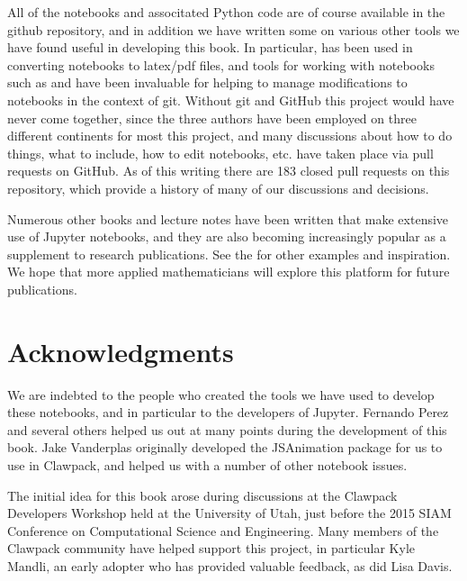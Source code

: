 \documentclass{SIAMbook2016}
\begin{document}
All of the notebooks and associtated Python code are of course available
in the github repository, and in addition we have written some
 on
various other tools we have found useful in developing this book. In
particular,  has
been used in converting notebooks to latex/pdf files, and tools for
working with notebooks such as
 and
 have been
invaluable for helping to manage modifications to notebooks in the
context of git. Without git and GitHub this
project would have never come together, since the three authors have
been employed on three different continents for most this project, and
many discussions about how to do things, what to include, how to edit
notebooks, etc. have taken place via pull requests on GitHub. As of this
writing there are 183
closed pull requests on this repository, which provide a history of many of
our discussions and decisions.

Numerous other books and lecture notes have been written that make
extensive use of Jupyter notebooks, and they are also becoming
increasingly popular as a supplement to research publications. See the
 for other examples and inspiration. We
hope that more applied mathematicians will explore this platform for
future publications.

\hypertarget{acknowledgments}{%
\section*{Acknowledgments}\label{acknowledgments}}

We are indebted to the people who created the tools we have used to
develop these notebooks, and in particular to the developers of Jupyter.
Fernando Perez and several others helped us out at many points during
the development of this book. Jake Vanderplas originally developed the
JSAnimation package for us to use in Clawpack, and helped us with a
number of other notebook issues.

The initial idea for this book arose during discussions at the Clawpack
Developers Workshop held at the University of Utah, just before the 2015
SIAM Conference on Computational Science and Engineering. Many members
of the Clawpack community have helped support this project, in
particular Kyle Mandli, an early adopter who has provided valuable
feedback, as did Lisa Davis.
\end{document}
